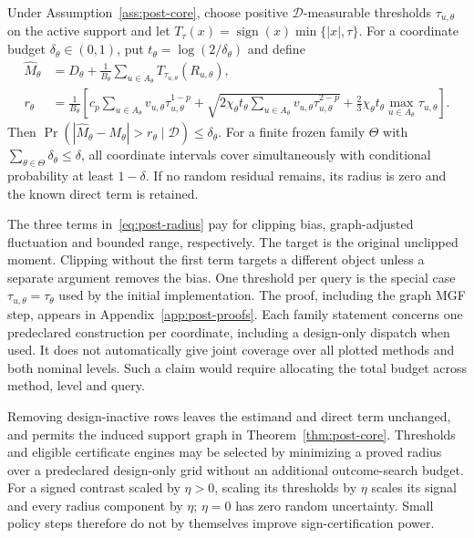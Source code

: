 \begin{theorem}
\label{thm:post-core}
Under Assumption~\ref{ass:post-core}, choose positive $\mathcal D$-measurable
thresholds $\tau_{u,\theta}$ on the active support and let
$T_\tau(x)=\operatorname{sign}(x)\min\{|x|,\tau\}$. For a coordinate budget
$\delta_\theta\in(0,1)$, put $t_\theta=\log(2/\delta_\theta)$ and define
\begin{align}
 \widehat M_\theta
 &=D_\theta+\frac{1}{B_\theta}
           \sum_{u\in A_\theta}T_{\tau_{u,\theta}}(R_{u,\theta}),
 \label{eq:post-estimator}\\
 r_\theta
 &=\frac{1}{B_\theta}\left[
 c_p\sum_{u\in A_\theta}v_{u,\theta}\tau_{u,\theta}^{1-p}
 +\sqrt{2\chi_\theta t_\theta
           \sum_{u\in A_\theta}v_{u,\theta}\tau_{u,\theta}^{2-p}}
 +\frac{2}{3}\chi_\theta t_\theta
                   \max_{u\in A_\theta}\tau_{u,\theta}\right].
 \label{eq:post-radius}
\end{align}
Then $\Pr(|\widehat M_\theta-M_\theta|>r_\theta\mid\mathcal D)
\leq\delta_\theta$. For a finite frozen family $\Theta$ with
$\sum_{\theta\in\Theta}\delta_\theta\leq\delta$, all coordinate intervals
cover simultaneously with conditional probability at least $1-\delta$.
If no random residual remains, its radius is zero and the known direct term
is retained.
\end{theorem}

The three terms in~\eqref{eq:post-radius} pay for clipping bias, graph-adjusted
fluctuation and bounded range, respectively. The target is the original
unclipped moment. Clipping without the first term targets a different object
unless a separate argument removes the bias. One threshold per query is the
special case $\tau_{u,\theta}=\tau_\theta$ used by the initial implementation.
The proof, including the graph MGF step, appears in
Appendix~\ref{app:post-proofs}.
Each family statement concerns one predeclared construction per coordinate,
including a design-only dispatch when used. It does not automatically give
joint coverage over all plotted methods and both nominal levels. Such a claim
would require allocating the total budget across method, level and query.

\begin{corollary}
\label{cor:post-locality}
Removing design-inactive rows leaves the estimand and direct term unchanged,
and permits the induced support graph in Theorem~\ref{thm:post-core}.
Thresholds and eligible certificate engines may be selected by minimizing a
proved radius over a predeclared design-only grid without an additional
outcome-search budget. For a signed contrast scaled by $\eta>0$, scaling its
thresholds by $\eta$ scales its signal and every radius component by $\eta$;
$\eta=0$ has zero random uncertainty. Small policy steps therefore do not by
themselves improve sign-certification power.
\end{corollary}

